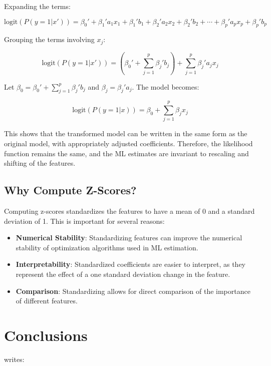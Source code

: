 \documentclass[a4paper,oneside,bibliography=totoc]{scrartcl}
\begin{document}
Expanding the terms:

\[
\text{logit}(P(y=1|x')) = \beta_0' + \beta_1' a_1 x_1 + \beta_1' b_1 + \beta_2' a_2 x_2 + \beta_2' b_2 + \cdots + \beta_p' a_p x_p + \beta_p' b_p
\]

Grouping the terms involving \( x_j \):

\[
\text{logit}(P(y=1|x')) = \left( \beta_0' + \sum_{j=1}^p \beta_j' b_j \right) + \sum_{j=1}^p \beta_j' a_j x_j
\]

Let \( \beta_0 = \beta_0' + \sum_{j=1}^p \beta_j' b_j \) and \( \beta_j = \beta_j' a_j \). The model becomes:

\[
\text{logit}(P(y=1|x)) = \beta_0 + \sum_{j=1}^p \beta_j x_j
\]

This shows that the transformed model can be written in the same form as the original model, with appropriately adjusted coefficients. Therefore, the likelihood function remains the same, and the ML estimates are invariant to rescaling and shifting of the features.

\subsection*{Why Compute Z-Scores?}

Computing z-scores standardizes the features to have a mean of 0 and a standard deviation of 1. This is important for several reasons:

\begin{itemize}
    \item \textbf{Numerical Stability}: Standardizing features can improve the numerical stability of optimization algorithms used in ML estimation.
    \item \textbf{Interpretability}: Standardized coefficients are easier to interpret, as they represent the effect of a one standard deviation change in the feature.
    \item \textbf{Comparison}: Standardizing allows for direct comparison of the importance of different features.
\end{itemize}


\section{Conclusions}

\citet{zobel2004} writes:
\end{document}
